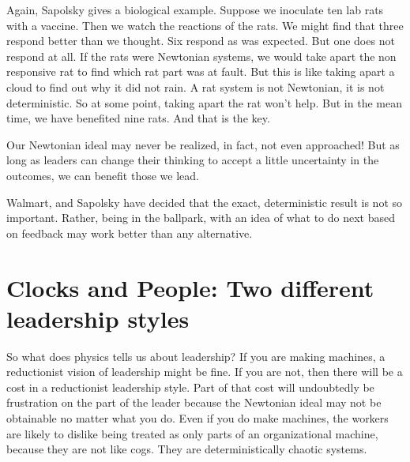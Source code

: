 \documentclass{article}
\begin{document}
Again, Sapolsky gives a biological example. Suppose we inoculate ten lab
rats with a vaccine. Then we watch the reactions of the rats. We might find
that three respond better than we thought. Six respond as was expected. But
one does not respond at all. If the rats were Newtonian systems, we would
take apart the non responsive rat to find which rat part was at fault. But
this is like taking apart a cloud to find out why it did not rain. A rat
system is not Newtonian, it is not deterministic. So at some point, taking
apart the rat won't help. But in the mean time, we have benefited nine rats.%
\cite{Sapolsky} And that is the key.

Our Newtonian ideal may never be realized, in fact, not even approached! But
as long as leaders can change their thinking to accept a little uncertainty
in the outcomes, we can benefit those we lead.

Walmart, and Sapolsky have decided that the exact, deterministic result is
not so important. Rather, being in the ballpark, with an idea of what to do
next based on feedback may work better than any alternative.

\section{Clocks and People: Two different leadership styles}

So what does physics tells us about leadership? If you are making machines,
a reductionist vision of leadership might be fine. If you are not, then
there will be a cost in a reductionist leadership style. Part of that cost
will undoubtedly be frustration on the part of the leader because the
Newtonian ideal may not be obtainable no matter what you do. Even if you do
make machines, the workers are likely to dislike being treated as only parts
of an organizational machine, because they are not like cogs. They are
deterministically chaotic systems.

\end{document}

